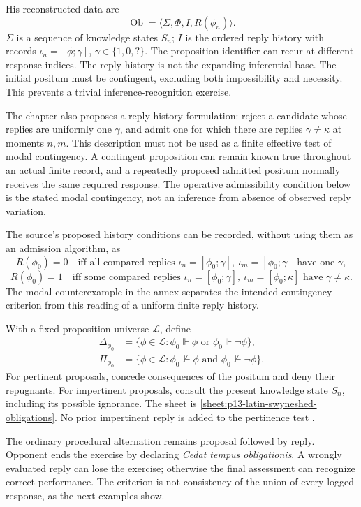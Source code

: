 His reconstructed data are
\[
 \operatorname{Ob}=\langle\Sigma,\Phi,I,R(\phi_n)\rangle .
\]
\(\Sigma\) is a sequence of knowledge states \(S_n\); \(I\) is the
ordered reply history with records \(\iota_n=[\phi;\gamma]\),
\(\gamma\in\{1,0,?\}\). The proposition identifier can recur at different
response indices. The reply history is not the expanding inferential base.
The initial positum must be contingent, excluding both impossibility and
necessity. This prevents a trivial inference-recognition exercise.

The chapter also proposes a reply-history formulation: reject a candidate
whose replies are uniformly one \(\gamma\), and admit one for which
there are replies \(\gamma\ne\kappa\) at moments \(n,m\).
This description must not be used as a finite effective test of modal
contingency. A contingent proposition can remain known true throughout
an actual finite record, and a repeatedly proposed admitted positum
normally receives the same required response. The operative admissibility
condition below is the stated modal contingency, not an inference
from absence of observed reply variation.

The source's proposed history conditions can be recorded, without
using them as an admission algorithm, as
\[
 R(\phi_0)=0\quad\text{iff all compared replies }
 \iota_n=[\phi_0;\gamma],\ \iota_m=[\phi_0;\gamma]
 \text{ have one }\gamma,
\]
\[
 R(\phi_0)=1\quad\text{iff some compared replies }
 \iota_n=[\phi_0;\gamma],\ \iota_m=[\phi_0;\kappa]
 \text{ have }\gamma\ne\kappa .
\]
The modal counterexample in the annex separates the intended contingency
criterion from this reading of a uniform finite reply history.

With a fixed proposition universe \(\mathcal L\), define
\[
 \begin{aligned}
 \Delta_{\phi_0}&=
 \{\phi\in\mathcal L:\phi_0\Vdash\phi\text{ or }\phi_0\Vdash\neg\phi\},
 \\
 \Pi_{\phi_0}&=
 \{\phi\in\mathcal L:\phi_0\nVdash\phi\text{ and }\phi_0\nVdash\neg\phi\}.
 \end{aligned}
\]
For pertinent proposals, concede consequences of the positum and deny
their repugnants. For impertinent proposals, consult the present
knowledge state \(S_n\), including its possible ignorance.
The sheet is \ref{sheet:p13-latin-swyneshed-obligations}.
No prior impertinent reply is added to the pertinence test
\cite[pp.~492--496]{DutilhNovaes2007FordhamChapter8}.

The ordinary procedural alternation remains proposal followed by reply.
Opponent ends the exercise by declaring \emph{Cedat tempus obligationis}.
A wrongly evaluated reply can lose the exercise; otherwise the final
assessment can recognize correct performance. The criterion is not
consistency of the union of every logged response, as the next examples show.

